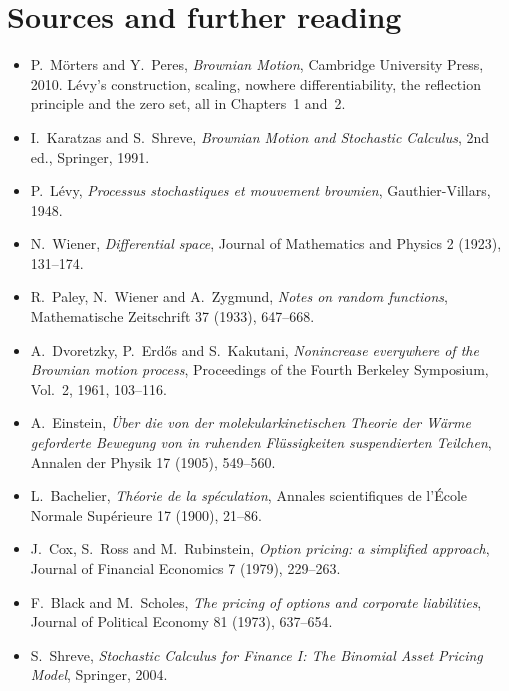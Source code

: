 \section*{Sources and further reading}

\begin{itemize}
\item P.~M\"orters and Y.~Peres, \emph{Brownian Motion}, Cambridge University Press, 2010. L\'evy's construction, scaling,
nowhere differentiability, the reflection principle and the zero set, all in Chapters~1 and~2.
\item I.~Karatzas and S.~Shreve, \emph{Brownian Motion and Stochastic Calculus}, 2nd ed., Springer, 1991.
\item P.~L\'evy, \emph{Processus stochastiques et mouvement brownien}, Gauthier-Villars, 1948.
\item N.~Wiener, \emph{Differential space}, Journal of Mathematics and Physics 2 (1923), 131--174.
\item R.~Paley, N.~Wiener and A.~Zygmund, \emph{Notes on random functions}, Mathematische Zeitschrift 37 (1933), 647--668.
\item A.~Dvoretzky, P.~Erd\H os and S.~Kakutani, \emph{Nonincrease everywhere of the Brownian motion process}, Proceedings of
the Fourth Berkeley Symposium, Vol.~2, 1961, 103--116.
\item A.~Einstein, \emph{\"Uber die von der molekularkinetischen Theorie der W\"arme geforderte Bewegung von in ruhenden
Fl\"ussigkeiten suspendierten Teilchen}, Annalen der Physik 17 (1905), 549--560.
\item L.~Bachelier, \emph{Th\'eorie de la sp\'eculation}, Annales scientifiques de l'\'Ecole Normale Sup\'erieure 17 (1900), 21--86.
\item J.~Cox, S.~Ross and M.~Rubinstein, \emph{Option pricing: a simplified approach}, Journal of Financial Economics 7
(1979), 229--263.
\item F.~Black and M.~Scholes, \emph{The pricing of options and corporate liabilities}, Journal of Political Economy 81
(1973), 637--654.
\item S.~Shreve, \emph{Stochastic Calculus for Finance I: The Binomial Asset Pricing Model}, Springer, 2004.
\end{itemize}
